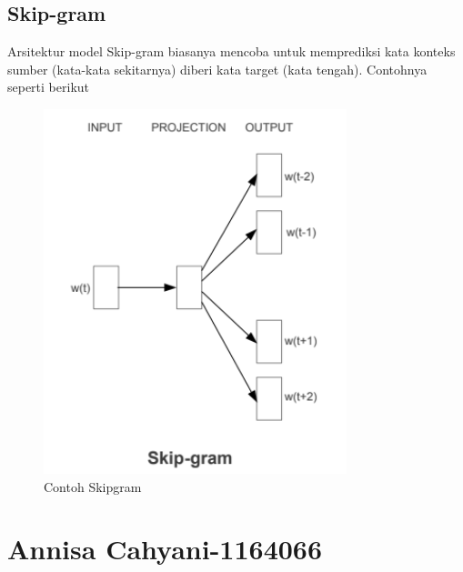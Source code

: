 \begin{enumerate}
\subsection{Skip-gram}
Arsitektur model Skip-gram biasanya  mencoba untuk memprediksi kata konteks sumber (kata-kata sekitarnya) diberi kata target (kata tengah). Contohnya seperti berikut 
\begin{figure}[ht]
\centering
\includegraphics[scale=0.5]{figures/chapter5tasya3.png}
\caption{Contoh Skipgram }
\label{Teori}
\end{figure}
\end{enumerate}


\section{Annisa Cahyani-1164066}
